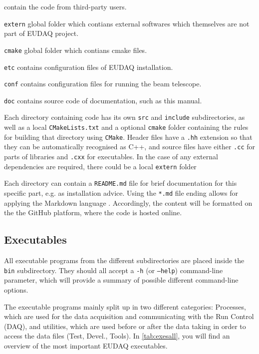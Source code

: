 \begin{myitemize}
\begin{myitemize}
  contain the code from third-party users.
  \end{myitemize}
\item \texttt{extern}
  global folder which contians external softwares which themselves are not part of EUDAQ project.
\item \texttt{cmake}
  global folder which contians cmake files.
\item \texttt{etc}
  contains configuration files of EUDAQ installation.
\item \texttt{conf}
  contains configuration files for running the beam telescope.
\item \texttt{doc}
  contains source code of documentation, such as this manual.
\end{myitemize}

Each directory containing code has its own \texttt{src} and \texttt{include} subdirectories,
as well as a local \texttt{CMakeLists.txt} and a optional \texttt{cmake} folder containing the rules
for building that directory using \texttt{CMake}.
Header files have a \texttt{.hh} extension so that they can be automatically recognised as C++,
and source files have either \texttt{.cc} for parts of libraries and \texttt{.cxx} for executables.
In the case of any external dependencies are required, there could be a local \texttt{extern} folder

Each directory can contain a \texttt{README.md} file for brief documentation for this specific part, e.g.  
as installation advice. 
Using the \texttt{*.md} file ending allows for applying the Markdown language \cite{markdownWWW}. 
Accordingly, the content will be formatted on the the GitHub platform, where the code is hosted online.

\subsection{Executables}
All executable programs from the different subdirectories are placed inside the \texttt{bin} subdirectory. They should all accept a \texttt{-h} (or \texttt{--help}) command-line parameter, which will provide a summary of possible different command-line options.

The executable programs mainly split up in two different categories: Processes, which are used for the data acquisition and communicating with the Run Control (DAQ), and utilities, which are used before or after the data taking in order to access the data files (Test, Devel., Tools).
In \autoref{tab:exesall}, you will find an overview of the most important EUDAQ executables.

